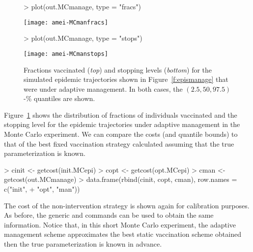 \documentclass[shortnames,nojss]{jss}
\begin{document}
\begin{figure}[ht!]
\begin{Schunk}
\begin{Sinput}
> plot(out.MCmanage, type = "fracs")
\end{Sinput}
\end{Schunk}
\centering
\texttt{[image: amei-MCmanfracs]}
\begin{Schunk}
\begin{Sinput}
> plot(out.MCmanage, type = "stops")
\end{Sinput}
\end{Schunk}
\texttt{[image: amei-MCmanstops]}
\caption{Fractions vaccinated ({\em top}) and stopping levels ({\em bottom}) for  
  the simulated epidemic trajectories shown in Figure~\ref{f:epismanage}
  that were under adaptive management.  In both cases, the $(2.5,50,97.5)$-\%
  quantiles are shown.}
\label{f:MCfracs}
\end{figure}
Figure~\ref{f:MCfracs} shows the distribution of fractions of
individuals vaccinated and the stopping level for the epidemic
trajectories under adaptive management in the Monte Carlo experiment.
We can compare the costs (and quantile bounds) to that of the best
fixed vaccination strategy calculated assuming that the true
parameterization is known.
\begin{Schunk}
\begin{Sinput}
> cinit <- getcost(init.MCepi)
> copt <- getcost(opt.MCepi)
> cman <- getcost(out.MCmanage)
> data.frame(rbind(cinit, copt, cman), row.names = c("init", 
+     "opt", "man"))
\end{Sinput}
\end{Schunk}
The cost of the non-intervention strategy is shown again for
calibration purposes.  As before, the generic  and 
 commands can be used to obtain the same information.
Notice that, in this short Monte Carlo experiment, the adaptive
management scheme approximates the best static vaccination scheme
obtained then the true parameterization is known in advance.  
\end{document}
